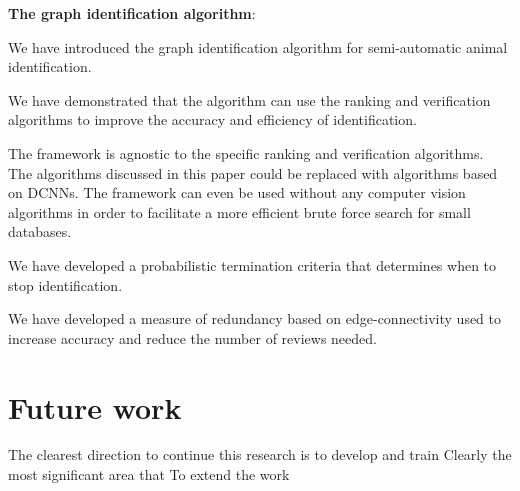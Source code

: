 \begin{itemln}

    \item \textbf{The graph identification algorithm}:
        \begin{enumln}
        \item We have introduced the graph identification algorithm for semi-automatic animal identification.

        \item We have demonstrated that the algorithm can use the ranking and verification algorithms to improve
          the accuracy and efficiency of identification.

        \item The framework is agnostic to the specific ranking and verification algorithms.
        The algorithms discussed in this paper could be replaced with algorithms based on DCNNs.
        The framework can even be used without any computer vision algorithms in order to facilitate a more
          efficient brute force search for small databases.

        \item We have developed a probabilistic termination criteria that determines when to stop identification.

        \item We have developed a measure of redundancy based on edge-connectivity used to increase accuracy and
          reduce the number of reviews needed.
        \end{enumln}

    \end{itemln}

    \section{Future work}\label{sec:futurework}
    The clearest direction to continue this research is to develop and train 
    Clearly the most significant area that
    To extend the work 



